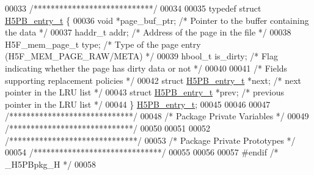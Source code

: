 \begin{DoxyCode}
00033 \textcolor{comment}{/****************************/}
00034 
00035 \textcolor{keyword}{typedef} \textcolor{keyword}{struct }\hyperlink{struct_h5_p_b__entry__t}{H5PB\_entry\_t} \{
00036     \textcolor{keywordtype}{void}            *page\_buf\_ptr;      \textcolor{comment}{/* Pointer to the buffer containing the data */}
00037     haddr\_t     addr;               \textcolor{comment}{/* Address of the page in the file */}
00038     H5F\_mem\_page\_t  type;               \textcolor{comment}{/* Type of the page entry (H5F\_MEM\_PAGE\_RAW/META) */}
00039     hbool\_t         is\_dirty;           \textcolor{comment}{/* Flag indicating whether the page has dirty data or not */}
00040 
00041     \textcolor{comment}{/* Fields supporting replacement policies */}
00042     \textcolor{keyword}{struct }\hyperlink{struct_h5_p_b__entry__t}{H5PB\_entry\_t}     *next;      \textcolor{comment}{/* next pointer in the LRU list */}
00043     \textcolor{keyword}{struct }\hyperlink{struct_h5_p_b__entry__t}{H5PB\_entry\_t}     *prev;      \textcolor{comment}{/* previous pointer in the LRU list */}
00044 \} \hyperlink{struct_h5_p_b__entry__t}{H5PB\_entry\_t};
00045 
00046 
00047 \textcolor{comment}{/*****************************/}
00048 \textcolor{comment}{/* Package Private Variables */}
00049 \textcolor{comment}{/*****************************/}
00050 
00051 
00052 \textcolor{comment}{/******************************/}
00053 \textcolor{comment}{/* Package Private Prototypes */}
00054 \textcolor{comment}{/******************************/}
00055 
00056 
00057 \textcolor{preprocessor}{#endif }\textcolor{comment}{/* \_H5PBpkg\_H */}\textcolor{preprocessor}{}
00058 
\end{DoxyCode}
